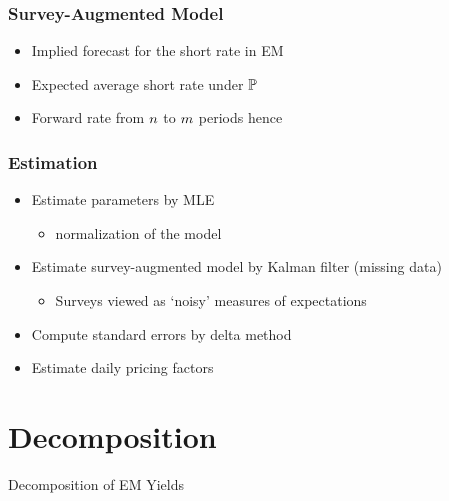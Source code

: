 \documentclass[12pt, aspectratio=169, xcolor=dvipsnames]{beamer}  %
\begin{document}
\begin{frame}[label=SvyAugModel]
\frametitle{Survey-Augmented Model}
\begin{itemize}
	\item Implied forecast for the short rate in EM
	
	\item Expected average short rate under \(\mathbb{P}\)
	
	\item Forward rate from \(n\) to \(m\) periods hence
	
\end{itemize}
\end{frame}

\begin{frame}
\frametitle{Estimation}
\begin{itemize}
	\item Estimate parameters by MLE
	\begin{itemize}
		\item \cite*{JSZ:2011} normalization of the model
	\end{itemize}
	\item Estimate survey-augmented model by Kalman filter (missing data)
	\begin{itemize}
		\item Surveys viewed as `noisy' measures of expectations
	\end{itemize}
	\item Compute standard errors by delta method
	\item Estimate daily pricing factors
\end{itemize}
\end{frame}

\section{Decomposition}

\begin{frame}
\begin{center}
	\huge \textcolor{yaleblue}{Decomposition of EM Yields}
\end{center}
\end{frame}
\end{document}

